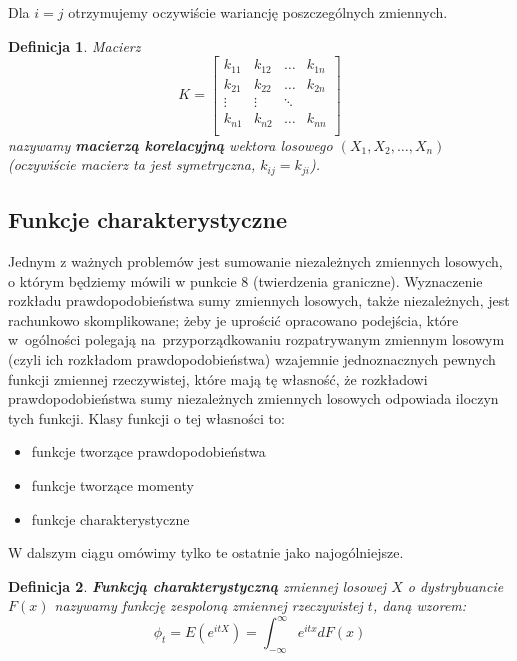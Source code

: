 \documentclass[10pt,a4paper]{article}
\newtheorem{definition}{Definicja}[section]
\numberwithin{equation}{subsection}
\begin{document}
Dla $i=j$ otrzymujemy oczywiście wariancję poszczególnych zmiennych.
\begin{definition}
  Macierz
  \begin{equation}
    K = \begin{bmatrix}
      k_{11} & k_{12} & \ldots &k_{1n} \\
      k_{21} & k_{22} & \ldots &k_{2n} \\
      \vdots & \vdots & \ddots \\
      k_{n1} & k_{n2} & \ldots &k_{nn} \\
    \end{bmatrix}
  \end{equation}
  nazywamy \textbf{macierzą korelacyjną} wektora losowego $(X_1,X_2,\ldots,X_n)$
  (oczywiście macierz ta jest symetryczna, $k_{ij}=k_{ji}$).
\end{definition}

\subsection{Funkcje charakterystyczne}
Jednym z ważnych problemów jest sumowanie niezależnych zmiennych losowych,
o którym będziemy mówili w punkcie 8 (twierdzenia graniczne).  Wyznaczenie
rozkładu prawdopodobieństwa sumy zmiennych losowych, także niezależnych,
jest rachunkowo skomplikowane; żeby je uprościć opracowano podejścia, które
w~ogólności polegają na~przyporządkowaniu rozpatrywanym zmiennym losowym
(czyli ich rozkładom prawdopodobieństwa) wzajemnie jednoznacznych pewnych
funkcji zmiennej rzeczywistej, które mają tę własność, że rozkładowi
prawdopodobieństwa sumy niezależnych zmiennych losowych odpowiada iloczyn tych
funkcji. Klasy funkcji o tej własności to:
\begin{itemize}
  \item funkcje tworzące prawdopodobieństwa
  \item funkcje tworzące momenty
  \item funkcje charakterystyczne
\end{itemize}
W dalszym ciągu omówimy tylko te ostatnie jako najogólniejsze.

\begin{definition}
  \textbf{Funkcją charakterystyczną} zmiennej losowej $X$ o dystrybuancie $F(x)$
  nazywamy funkcję zespoloną zmiennej rzeczywistej $t$, daną wzorem:
  \begin{equation}
    \phi_t = E(e^{itX}) = \int_{-\infty}^{\infty}e^{itx}dF(x)
  \end{equation}
\end{definition}
\end{document}
